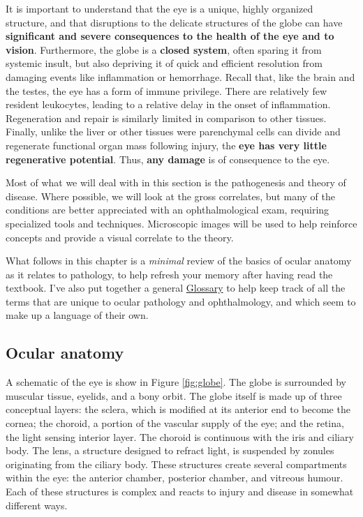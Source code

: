 \documentclass[openany]{article}
\begin{document}
It is important to understand that the eye is a unique, highly organized
structure, and that disruptions to the delicate structures of the globe
can have \textbf{significant and severe consequences to the health of
the eye and to vision}. Furthermore, the globe is a \textbf{closed
system}, often sparing it from systemic insult, but also depriving it of
quick and efficient resolution from damaging events like inflammation or
hemorrhage. Recall that, like the brain and the testes, the eye has a
form of immune privilege. There are relatively few resident leukocytes,
leading to a relative delay in the onset of inflammation. Regeneration
and repair is similarly limited in comparison to other tissues. Finally,
unlike the liver or other tissues were parenchymal cells can divide and
regenerate functional organ mass following injury, the \textbf{eye has
very little regenerative potential}. Thus, \textbf{any damage} is of
consequence to the eye.

Most of what we will deal with in this section is the pathogenesis and
theory of disease. Where possible, we will look at the gross correlates,
but many of the conditions are better appreciated with an
ophthalmological exam, requiring specialized tools and techniques.
Microscopic images will be used to help reinforce concepts and provide a
visual correlate to the theory.

What follows in this chapter is a \emph{minimal} review of the basics of
ocular anatomy as it relates to pathology, to help refresh your memory
after having read the textbook. I've also put together a general
\protect\hyperlink{glossary}{Glossary} to help keep track of all the
terms that are unique to ocular pathology and ophthalmology, and which
seem to make up a language of their own.

\hypertarget{ocular-anatomy}{\subsection{Ocular
anatomy}\label{ocular-anatomy}}

A schematic of the eye is show in Figure \ref{fig:globe}. The globe is
surrounded by muscular tissue, eyelids, and a bony orbit. The globe
itself is made up of three conceptual layers: the sclera, which is
modified at its anterior end to become the cornea; the choroid, a
portion of the vascular supply of the eye; and the retina, the light
sensing interior layer. The choroid is continuous with the iris and
ciliary body. The lens, a structure designed to refract light, is
suspended by zonules originating from the ciliary body. These structures
create several compartments within the eye: the anterior chamber,
posterior chamber, and vitreous humour. Each of these structures is
complex and reacts to injury and disease in somewhat different ways.
\end{document}
